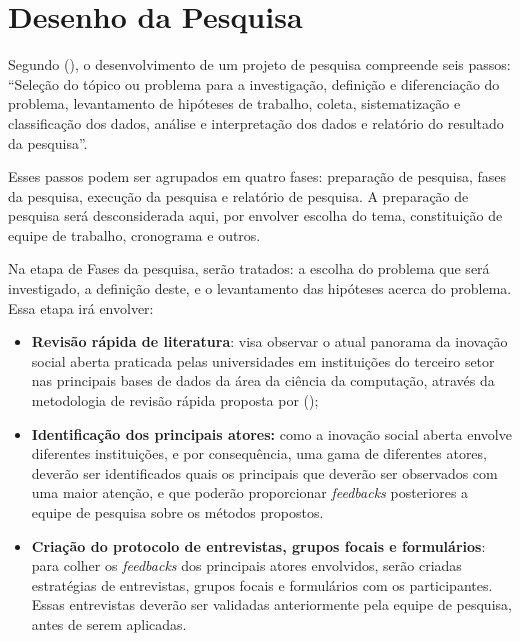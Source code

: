 \section{Desenho da Pesquisa}
\label{desenhodepesquisa}

Segundo \citeauthor{marconi2003} (\citeyear{marconi2003}), o desenvolvimento de um projeto de pesquisa compreende seis passos: 
“Seleção do tópico ou problema para a investigação, definição e diferenciação do problema, levantamento de hipóteses de trabalho, coleta, sistematização e classificação dos dados, análise e interpretação dos dados e relatório do resultado da pesquisa”.

Esses passos podem ser agrupados em quatro fases: preparação de pesquisa, fases da pesquisa, execução da pesquisa e relatório de pesquisa. A preparação de pesquisa será desconsiderada aqui, por envolver escolha do tema, constituição de equipe de trabalho, cronograma e outros. \cite{marconi2003}


Na etapa de Fases da pesquisa, serão tratados: a escolha do problema que será investigado, a definição deste, e o levantamento das hipóteses acerca do problema. Essa etapa irá envolver:
\begin{itemize}
    \item \textbf{Revisão rápida de literatura}: visa observar o atual panorama da inovação social aberta praticada pelas universidades em instituições do terceiro setor nas principais bases de dados da área da ciência da computação, através da metodologia de revisão rápida proposta por \citeauthor{cartaxo2020} (\citeyear{cartaxo2020});
    \item \textbf{Identificação dos principais atores:} como a inovação social aberta envolve diferentes instituições, e por consequência, uma gama de diferentes atores, deverão ser identificados quais os principais que deverão ser observados com uma maior atenção, e que poderão proporcionar \textit{feedbacks} posteriores a equipe de pesquisa sobre os métodos propostos.
    \item \textbf{Criação do protocolo de entrevistas, grupos focais e formulários}: para colher os \textit{feedbacks} dos principais atores envolvidos, serão criadas estratégias de entrevistas, grupos focais e formulários com os participantes. Essas entrevistas deverão ser validadas anteriormente pela equipe de pesquisa, antes de serem aplicadas.
\end{itemize}

